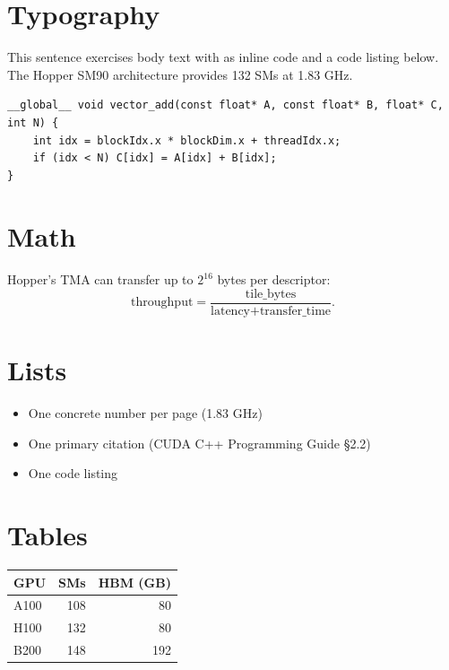 \documentclass[lecture]{handout}
\begin{document}
\maketitle

\section{Typography}
This sentence exercises body text with  as inline code and a code listing below.
The Hopper SM90 architecture provides 132 SMs at 1.83 GHz.

\begin{lstlisting}[language=CUDA, caption={Vector add kernel — see CUDA C++ Programming Guide \S 2.2}]
__global__ void vector_add(const float* A, const float* B, float* C, int N) {
    int idx = blockIdx.x * blockDim.x + threadIdx.x;
    if (idx < N) C[idx] = A[idx] + B[idx];
}
\end{lstlisting}

\section{Math}
Hopper's TMA can transfer up to \(2^{16}\) bytes per descriptor:
\[
	\text{throughput} = \frac{\text{tile\_bytes}}{\text{latency} + \text{transfer\_time}}.
\]

\section{Lists}
\begin{itemize}
	\item One concrete number per page (1.83 GHz)
	\item One primary citation (CUDA C++ Programming Guide \S 2.2)
	\item One code listing
\end{itemize}

\section{Tables}
\begin{center}
	\begin{tabular}{lrr}
		\toprule
		\textbf{GPU} & \textbf{SMs} & \textbf{HBM (GB)} \\
		\midrule
		A100         & 108          & 80                \\
		H100         & 132          & 80                \\
		B200         & 148          & 192               \\
		\bottomrule
	\end{tabular}
\end{center}
\end{document}
